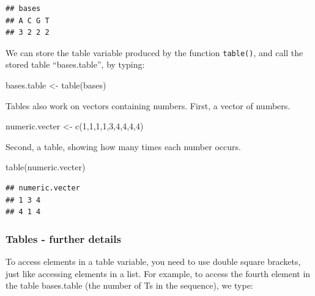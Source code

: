 \documentclass[
]{book}
\newenvironment{Shaded}{\begin{snugshade}}{\end{snugshade}}
\newcommand{\DecValTok}[1]{\textcolor[rgb]{0.00,0.00,0.81}{#1}}
\newcommand{\FunctionTok}[1]{\textcolor[rgb]{0.00,0.00,0.00}{#1}}
\newcommand{\NormalTok}[1]{#1}
\newcommand{\OtherTok}[1]{\textcolor[rgb]{0.56,0.35,0.01}{#1}}
\begin{document}
\begin{verbatim}
## bases
## A C G T 
## 3 2 2 2
\end{verbatim}

We can store the table variable produced by the function \texttt{table()}, and call the stored table ``bases.table'', by typing:

\begin{Shaded}
\begin{Highlighting}[]
\NormalTok{bases.table }\OtherTok{\textless{}{-}} \FunctionTok{table}\NormalTok{(bases)}
\end{Highlighting}
\end{Shaded}

Tables also work on vectors containing numbers. First, a vector of numbers.

\begin{Shaded}
\begin{Highlighting}[]
\NormalTok{numeric.vecter }\OtherTok{\textless{}{-}} \FunctionTok{c}\NormalTok{(}\DecValTok{1}\NormalTok{,}\DecValTok{1}\NormalTok{,}\DecValTok{1}\NormalTok{,}\DecValTok{1}\NormalTok{,}\DecValTok{3}\NormalTok{,}\DecValTok{4}\NormalTok{,}\DecValTok{4}\NormalTok{,}\DecValTok{4}\NormalTok{,}\DecValTok{4}\NormalTok{)}
\end{Highlighting}
\end{Shaded}

Second, a table, showing how many times each number occurs.

\begin{Shaded}
\begin{Highlighting}[]
\FunctionTok{table}\NormalTok{(numeric.vecter)}
\end{Highlighting}
\end{Shaded}

\begin{verbatim}
## numeric.vecter
## 1 3 4 
## 4 1 4
\end{verbatim}

\hypertarget{tables---further-details}{%
\subsubsection{Tables - further details}\label{tables---further-details}}

To access elements in a table variable, you need to use double square brackets, just like accessing elements in a list. For example, to access the fourth element in the table bases.table (the number of Ts in the sequence), we type:
\end{document}
